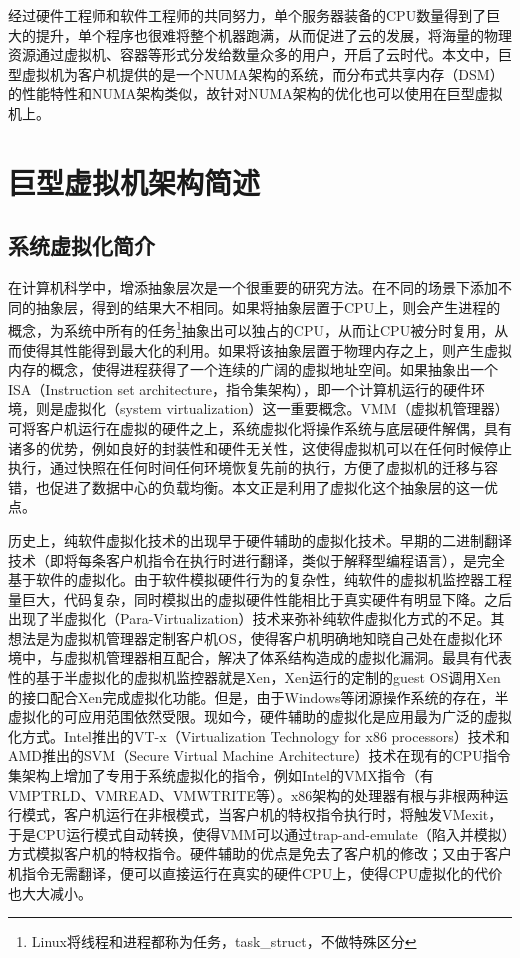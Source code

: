 经过硬件工程师和软件工程师的共同努力，单个服务器装备的CPU数量得到了巨大的提升，单个程序也很难将整个机器跑满，从而促进了云的发展，将海量的物理资源通过虚拟机、容器等形式分发给数量众多的用户，开启了云时代。本文中，巨型虚拟机为客户机提供的是一个NUMA架构的系统，而分布式共享内存（DSM）的性能特性和NUMA架构类似，故针对NUMA架构的优化也可以使用在巨型虚拟机上。
\section{巨型虚拟机架构简述}
\subsection{系统虚拟化简介}
在计算机科学中，增添抽象层次是一个很重要的研究方法。在不同的场景下添加不同的抽象层，得到的结果大不相同。如果将抽象层置于CPU上，则会产生进程的概念，为系统中所有的任务\footnote{Linux将线程和进程都称为任务，task\_struct，不做特殊区分}抽象出可以独占的CPU，从而让CPU被分时复用，从而使得其性能得到最大化的利用。如果将该抽象层置于物理内存之上，则产生虚拟内存的概念，使得进程获得了一个连续的广阔的虚拟地址空间。如果抽象出一个ISA（Instruction set architecture，指令集架构），即一个计算机运行的硬件环境，则是虚拟化（system virtualization）这一重要概念。VMM（虚拟机管理器）可将客户机运行在虚拟的硬件之上，系统虚拟化将操作系统与底层硬件解偶，具有诸多的优势，例如良好的封装性和硬件无关性\cite{sysv}，这使得虚拟机可以在任何时候停止执行，通过快照在任何时间任何环境恢复先前的执行，方便了虚拟机的迁移与容错，也促进了数据中心的负载均衡。本文正是利用了虚拟化这个抽象层的这一优点。

历史上，纯软件虚拟化技术的出现早于硬件辅助的虚拟化技术。早期的二进制翻译技术（即将每条客户机指令在执行时进行翻译，类似于解释型编程语言），是完全基于软件的虚拟化。由于软件模拟硬件行为的复杂性，纯软件的虚拟机监控器工程量巨大，代码复杂，同时模拟出的虚拟硬件性能相比于真实硬件有明显下降。之后出现了半虚拟化（Para-Virtualization）技术来弥补纯软件虚拟化方式的不足。其想法是为虚拟机管理器定制客户机OS，使得客户机明确地知晓自己处在虚拟化环境中，与虚拟机管理器相互配合，解决了体系结构造成的虚拟化漏洞。最具有代表性的基于半虚拟化的虚拟机监控器就是Xen\cite{artofxen}，Xen运行的定制的guest OS调用Xen的接口配合Xen完成虚拟化功能。但是，由于Windows等闭源操作系统的存在，半虚拟化的可应用范围依然受限。现如今，硬件辅助的虚拟化是应用最为广泛的虚拟化方式。Intel推出的VT-x（Virtualization Technology for x86 processors）技术\cite{intelv}和AMD推出的SVM（Secure Virtual Machine Architecture）技术\cite{amdv}在现有的CPU指令集架构上增加了专用于系统虚拟化的指令，例如Intel的VMX指令（有VMPTRLD、VMREAD、VMWTRITE等）\cite{intelSDM}。x86架构的处理器有根与非根两种运行模式，客户机运行在非根模式，当客户机的特权指令执行时，将触发VMexit，于是CPU运行模式自动转换，使得VMM可以通过trap-and-emulate（陷入并模拟）方式模拟客户机的特权指令。硬件辅助的优点是免去了客户机的修改；又由于客户机指令无需翻译，便可以直接运行在真实的硬件CPU上，使得CPU虚拟化的代价也大大减小。

